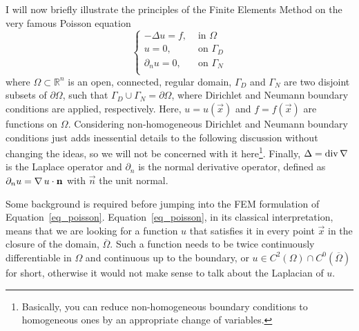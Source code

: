 I will now briefly illustrate the principles of the Finite Elements Method on the very famous Poisson equation
\begin{equation}
  \begin{cases}
   -\Delta u = f, &\text{ in } \Omega \\
   u = 0, &\text{ on } \Gamma_D \\
   \partial_{n} u = 0, &\text{ on } \Gamma_N \\
  \end{cases}
  \label{eq_poisson}
\end{equation}
where \(\Omega \subset \mathbb{R}^n\) is an open, connected, regular domain, \(\Gamma_D\) and \(\Gamma_N\) are two disjoint subsets of \(\partial \Omega\), such that \(\Gamma_D \cup \Gamma_N = \partial \Omega\), where Dirichlet and Neumann boundary conditions are applied, respectively.
Here, \(u = u(\vec{x})\) and \(f = f(\vec{x})\) are functions on
\(\Omega\).
Considering non-homogeneous Dirichlet and Neumann boundary conditions just adds
inessential details to the following discussion without changing the
ideas, so we will not be concerned with it here\footnote{Basically, you
can reduce non-homogeneous boundary conditions to homogeneous ones by an
appropriate change of variables.}.
Finally, \(\Delta = \operatorname{div} \operatorname{\nabla}\) is the Laplace operator and \(\partial_{n}\) is the normal derivative operator, defined as \(\partial_{n} u = \operatorname{\nabla} u \cdot \mathbf{n}\) with \(\vec{n}\) the unit normal.

Some background is required before jumping into the FEM formulation of Equation~\eqref{eq_poisson}.
Equation~\eqref{eq_poisson}, in its classical interpretation, means that we are looking for a function \(u\) that satisfies it in every point \(\vec{x}\) in the closure of the domain, \(\overline\Omega\).
Such a function needs to be twice continuously differentiable in \(\Omega\) and continuous up to the boundary, or \(u \in C^2(\Omega) \cap C^0(\overline\Omega)\) for short, otherwise it would not make sense to talk about the Laplacian of \(u\).

